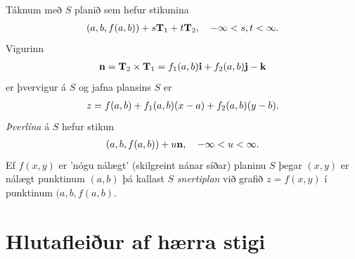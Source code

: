 \documentclass[a4paper,10pt,icelandic]{sphinxmanual}
\begin{document}
Táknum með \(S\) planið sem hefur stikunina
\begin{gather}
\begin{split}\displaystyle (a,b,f(a,b))+s\mbox{${\bf T}$}_1+t\mbox{${\bf T}$}_2, \quad -\infty < s,t < \infty.\end{split}\notag
\end{gather}
Vigurinn
\begin{gather}
\begin{split}\displaystyle \mbox{${\bf n}$}=\mbox{${\bf T}$}_2\times \mbox{${\bf T}$}_1=f_1(a,b)\mbox{${\bf i}$}+f_2(a,b)\mbox{${\bf j}$}-\mbox{${\bf k}$}\end{split}\notag
\end{gather}
er þvervigur á \(S\) og jafna plansins \(S\) er
\begin{gather}
\begin{split}\displaystyle z=f(a,b)+f_1(a,b)(x-a)+f_2(a,b)(y-b).\end{split}\notag
\end{gather}
\emph{Þverlína} á \(S\) hefur stikun
\begin{gather}
\begin{split}\displaystyle (a,b,f(a,b)) + u \mbox{${\bf n}$}, \quad -\infty < u < \infty.\end{split}\notag
\end{gather}
Ef \(f(x,y)\) er ’nógu nálægt’ (skilgreint nánar síðar) planinu
\(S\) þegar \((x,y)\) er nálægt punktinum \((a,b)\) þá
kallast \(S\) \emph{snertiplan} við grafið \(z=f(x,y)\) í punktinum
\((a,b,f(a,b)\).


\section{Hlutafleiður af hærra stigi}
\label{Kafli2:hlutafleiur-af-haerra-stigi}
\end{document}
